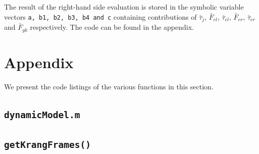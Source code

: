 \documentclass[a4paper,10pt]{article}
\begin{document}
The result of the right-hand side evaluation is stored in the symbolic variable vectors \texttt{a, b1, b2, b3, b4 and c}
containing contributions of $\bar\tau_j$, $\bar{F}_{el}$, $\bar\tau_{el}$, $\bar{F}_{er}$, $\bar\tau_{er}$ and
$\bar{F}_{gk}$ respectively. The code can be found in the appendix.


% 
% 
\section{Appendix}

We present the code listings of the various functions in this section.

\subsection{\texttt{dynamicModel.m}}


\subsection{\texttt{getKrangFrames()}}

\end{document}
